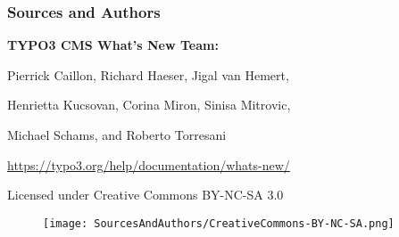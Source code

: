%

\begin{frame}[fragile]
	\frametitle{Sources and Authors}

	\vspace{-0.6cm}

	\centerline{\textbf{TYPO3 CMS What's New Team:}}

	\begin{center}
		\centerline{Pierrick Caillon, Richard Haeser, Jigal van Hemert,}
		\centerline{Henrietta Kucsovan, Corina Miron, Sinisa Mitrovic,}
		\centerline{Michael Schams, and Roberto Torresani}
	\end{center}

	\vspace{0.6cm}

	\smaller\begin{center}\url{https://typo3.org/help/documentation/whats-new/}\end{center}\normalsize

	\vspace{1cm}

	\smaller\begin{center}Licensed under Creative Commons BY-NC-SA 3.0\end{center}\normalsize
	\begin{figure}\vspace*{-0.4cm}
		\texttt{[image: SourcesAndAuthors/CreativeCommons-BY-NC-SA.png]}
	\end{figure}

\end{frame}

